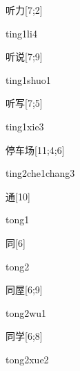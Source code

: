 \begin{verbete}[ting1li4]{听力}[7;2]
\begin{pronuncia}{ting1li4}
\end{pronuncia}
\end{verbete}

\begin{verbete}{听说}[7;9]
\begin{pronuncia}{ting1shuo1}
\end{pronuncia}
\end{verbete}

\begin{verbete}{听写}[7;5]
\begin{pronuncia}{ting1xie3}
\end{pronuncia}
\end{verbete}

\begin{verbete}{停车场}[11;4;6]
\begin{pronuncia}[\\]{ting2che1chang3}
\end{pronuncia}
\end{verbete}

\begin{verbete}[tong1]{通}[10]
\begin{pronuncia}{tong1}
\end{pronuncia}
\end{verbete}

\begin{verbete}[tong2]{同}[6]
\begin{pronuncia}{tong2}
\end{pronuncia}
\end{verbete}

\begin{verbete}[tong2wu1]{同屋}[6;9]
\begin{pronuncia}{tong2wu1}
\end{pronuncia}
\end{verbete}

\begin{verbete}{同学}[6;8]
\begin{pronuncia}{tong2xue2}
\end{pronuncia}
\end{verbete}

